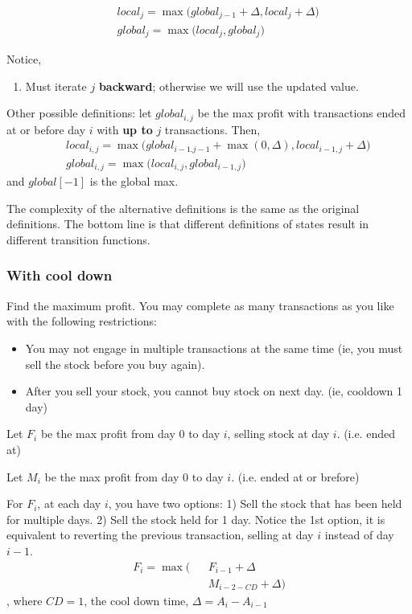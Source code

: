 {
\begin{eqnarray*}
&& local_{j} = \max\Big(global_{j-1} + \Delta, local_{j}+\Delta\Big)
\nonumber \\
&& global_{j} = \max\Big(local_{j}, global_{j}\Big)
\end{eqnarray*}

Notice,
\begin{enumerate}
\item Must iterate $j$ \textbf{backward}; otherwise we will use the updated value. 
\end{enumerate}

Other possible definitions: let $global_{i, j}$ be the max profit
with transactions ended at or before day $i$ with \textbf{up to} $j$ transactions. Then, 
\begin{eqnarray*}
&& local_{i,j} = \max\Big(global_{i-1.j-1} + \max(0, \Delta), local_{i-1,j}+\Delta\Big)
\nonumber \\
&& global_{i,j} = \max\Big(local_{i, j}, global_{i-1,j}\Big)
\end{eqnarray*}
and $global[-1]$ is the global max. 

The complexity of the alternative definitions is the same as the original definitions. The bottom line is that different definitions of states result in different transition functions.
\subsubsection{With cool down}

Find the maximum profit. You may complete as many transactions as you like with the following restrictions:
\begin{itemize}
\item You may not engage in multiple transactions at the same time (ie, you must sell the stock before you buy again).
\item After you sell your stock, you cannot buy stock on next day. (ie, cooldown 1 day)
\end{itemize}

Let $F_i$ be the max profit from day 0 to day $i$, selling stock at day $i$. (i.e. ended at)

Let $M_i$ be the max profit from day 0 to day $i$. (i.e. ended at or brefore)

For $F_i$, at each day $i$, you have two options: 1) Sell the stock that has been held for multiple days. 2) Sell the stock held for 1 day.
Notice the 1st option, it is equivalent to reverting the previous transaction, selling at day $i$ instead of day $i-1$.
\begin{eqnarray*}
F_{i}= \max\big(&&F_{i-1}+\Delta \\
&&M_{i-2-CD}+\Delta \big)
\end{eqnarray*}
, where $CD=1$, the cool down time, $\Delta = A_i-A_{i-1}$ 

}
